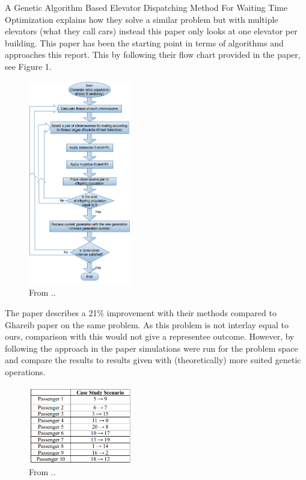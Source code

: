
A Genetic Algorithm Based Elevator Dispatching Method For Waiting Time Optimization \cite{tartan2016genetic} explains how they solve a similar problem but with multiple elevators (what they call cars) instead this paper only looks at one elevator per building. This paper has been the starting point in terms of algorithms and approaches this report. This by following their flow chart provided in the paper, see Figure 1. 

\begin{figure}[h!]
\centering
\includegraphics[width=0.4\textwidth]{diagram_1.png}
\caption{From ..}
	\label{fig:Flow_1}
\end{figure}
The paper describes a 21\% improvement with their methods compared to Ghareib paper \cite{gharieb2005optimal} on the same problem. As this problem is not interlay equal to ours, comparison with this would not give a representee outcome. However, by following the approach in the paper simulations were run for the problem space and compare the results to results given with (theoretically) more suited genetic operations.
\newpage

\begin{figure}[h!]
\centering
\includegraphics[width=0.4\textwidth]{tabel_1.png}
\caption{From ..}
\end{figure}

